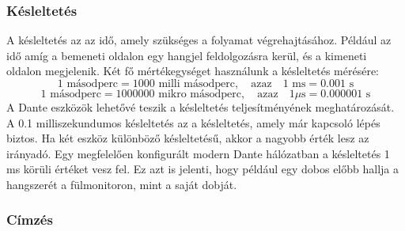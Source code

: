\subsubsection{Késleltetés}
A késleltetés az az idő, amely szükséges a folyamat végrehajtásához. Például
az idő amíg a bemeneti oldalon egy hangjel feldolgozásra kerül, és a kimeneti
oldalon megjelenik. 
Két fő mértékegységet használunk a késleltetés mérésére:
\begin{equation}
	\label{eq:milliseconds}
	1 \text{ másodperc} = 1000 \text{ milli másodperc}, \quad \text{azaz} \quad 1 \text{ ms} = 0.001 \text{ s}
\end{equation}
\begin{equation}
	\label{eq:microseconds}
	1 \text{ másodperc} = 1000000 \text{ mikro másodperc}, \quad \text{azaz} \quad 1 \mu\text{s} = 0.000001 \text{ s}
\end{equation}
A Dante eszközök lehetővé teszik a késleltetés teljesítményének meghatározását. 
A 0.1 milliszekundumos késleltetés az a késleltetés, amely már kapcsoló lépés biztos.
Ha két eszköz különböző késleltetésű, akkor a nagyobb érték lesz az irányadó.
Egy megfelelően konfigurált modern Dante hálózatban a késleltetés 1 ms körüli értéket vesz fel.
Ez azt is jelenti, hogy például egy dobos előbb hallja a hangszerét a fülmonitoron, mint a saját dobját.

\subsubsection{Címzés}




